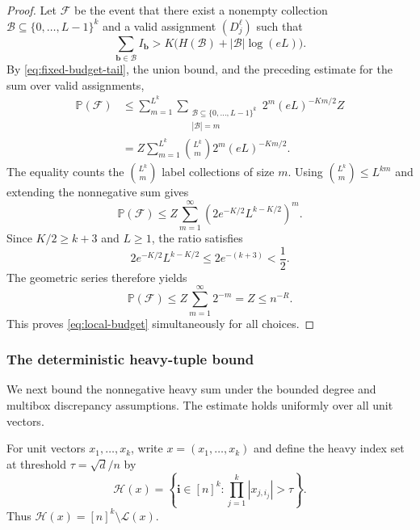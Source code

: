 \documentclass[11pt,reqno]{amsart}
\numberwithin{equation}{section}
\theoremstyle{definition}
\theoremstyle{remark}
\newcommand{\Pp}{\mathbb P}
\begin{document}
\begin{proof}
Let $\mathcal F$ be the event that there exist a nonempty collection
$\mathcal B\subseteq\{0,\ldots,L-1\}^k$ and a valid assignment
$(D_j^\ell)$ such that
\[
 \sum_{\mathbf{b}\in\mathcal B}I_{\mathbf{b}}>
 K\bigl(H(\mathcal B)+|\mathcal B|\log(eL)\bigr).
\]
By \eqref{eq:fixed-budget-tail}, the union bound, and the preceding
estimate for the sum over valid assignments,
\begin{align*}
 \Pp(\mathcal F)
 &\le\sum_{m=1}^{L^k}
     \sum_{\substack{\mathcal B\subseteq\{0,\ldots,L-1\}^k\\|\mathcal B|=m}}
       2^m(eL)^{-Km/2}Z\\
 &=Z\sum_{m=1}^{L^k}\binom{L^k}{m}2^m(eL)^{-Km/2}.
\end{align*}
The equality counts the $\binom{L^k}{m}$ label collections of size $m$.
Using $\binom{L^k}{m}\le L^{km}$ and extending the nonnegative sum gives
\[
 \Pp(\mathcal F)
 \le Z\sum_{m=1}^\infty
       \left(2e^{-K/2}L^{k-K/2}\right)^m.
\]
Since $K/2\ge k+3$ and $L\ge1$, the ratio satisfies
\[
 2e^{-K/2}L^{k-K/2}\le2e^{-(k+3)}<\frac12.
\]
The geometric series therefore yields
\[
 \Pp(\mathcal F)\le Z\sum_{m=1}^\infty2^{-m}=Z\le n^{-R}.
\]
This proves \eqref{eq:local-budget} simultaneously for all choices.
\end{proof}

\subsubsection{The deterministic heavy-tuple bound}\label{sec:heavy-sum}

We next bound the nonnegative heavy sum under the bounded degree
and multibox discrepancy assumptions. The estimate holds uniformly
over all unit vectors. 

For unit vectors $x_1,\ldots,x_k$, write $x=(x_1,\ldots,x_k)$ and
define the heavy index set at threshold $\tau=\sqrt d/n$ by
\[
 \mathcal H(x)=\left\{\mathbf i\in[n]^k:
                  \prod_{j=1}^k|x_{j,i_j}|>\tau\right\}.
\]
Thus $\mathcal H(x)=[n]^k\setminus\mathcal L(x)$.
\end{document}
